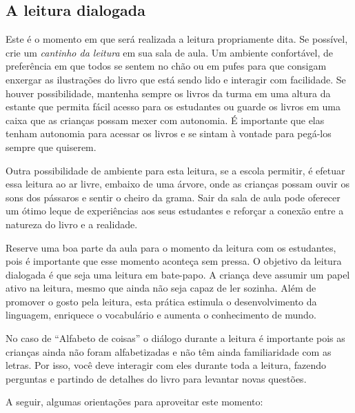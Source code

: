 \documentclass[11pt]{extarticle}
\begin{document}
\subsection{A leitura dialogada}
Este é o momento em que será realizada a leitura propriamente dita. 
Se possível, crie um \textit{cantinho da leitura} em sua sala de aula. Um 
ambiente confortável, de preferência em que todos se sentem no chão ou 
em pufes para que consigam enxergar as ilustrações do livro que está 
sendo lido e interagir com facilidade. Se houver possibilidade, mantenha 
sempre os livros da turma em uma altura da estante que permita fácil 
acesso para os estudantes ou guarde os livros em uma caixa que as crianças 
possam mexer com autonomia. É importante que elas tenham autonomia para 
acessar os livros e se sintam à vontade para pegá-los sempre que quiserem. 


Outra possibilidade de ambiente para esta leitura, se a escola permitir, 
é efetuar essa leitura ao ar livre, embaixo de uma árvore, onde as crianças 
possam ouvir os sons dos pássaros e sentir o cheiro da grama. Sair da sala 
de aula pode oferecer um ótimo leque de experiências aos seus estudantes e 
reforçar a conexão entre a natureza do livro e a realidade.  

Reserve uma boa parte da aula para o momento da leitura com os estudantes, 
pois é importante que esse momento aconteça sem pressa. O objetivo da 
leitura dialogada é que seja uma leitura em bate-papo. A criança deve 
assumir um papel ativo na leitura, mesmo que ainda não seja capaz de 
ler sozinha. Além de promover o gosto pela leitura, esta prática estimula 
o desenvolvimento da linguagem, enriquece o vocabulário e 
aumenta o conhecimento de mundo.

No caso de ``Alfabeto de coisas'' o diálogo durante a leitura
é importante pois as crianças ainda não foram alfabetizadas 
e não têm ainda familiaridade com as letras. Por isso, 
você deve interagir com eles durante toda a 
leitura, fazendo perguntas e partindo de detalhes do livro para 
levantar novas questões. 

A seguir, algumas orientações para aproveitar este momento: 
\end{document}
